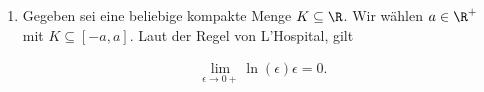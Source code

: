 
\begin{solution}

\phantom{}

\begin{enumerate}[label = (\roman*)]

    \item Gegeben sei eine beliebige kompakte Menge $K \subseteq \R$.
    Wir wählen $a \in \R^+$ mit $K \subseteq [-a, a]$.
    Laut der Regel von L'Hospital, gilt

    \begin{align*}
        \lim_{\epsilon \to 0+}
        \ln{(\epsilon)} \epsilon = 0.
    \end{align*}


\end{enumerate}
\end{solution}
